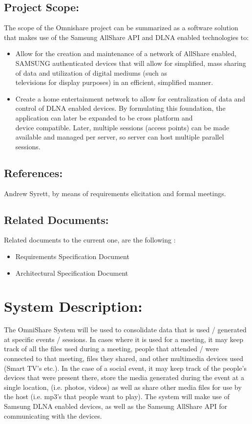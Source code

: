 \documentclass[12pt]{article}
\begin{document}
\subsection{Project Scope:}
The scope of the Omnishare project can be summarized as a software solution that makes use of the Samsung AllShare API and DLNA enabled technologies to:
\begin{itemize}
\item Allow for the creation and maintenance of a network of AllShare enabled, SAMSUNG authenticated devices  that will allow for simplified, mass sharing of data and utilization of digital mediums (such as
\\ televisions for display purposes) in an efficient, simplified manner.
\item  Create a home entertainment network to allow for centralization of data and control of DLNA enabled devices.
By formulating this foundation, the application can later be expanded to be cross platform and 
\\device compatible.  Later, multiple sessions (access points) can be made available and managed per server, so server can host multiple parallel sessions.
\end{itemize}

\subsection{References:}
Andrew Syrett, by means of requirements elicitation and formal meetings.

\subsection{Related Documents:}
Related documents to the current one, are the following :
\begin{itemize}
\item Requirements Specification Document
\item Architectural Specification Document
\end{itemize}

\newpage
\section{System Description:}
The OmniShare System will be used to consolidate data that is used / generated at specific events / sessions. In cases where it is used for a meeting, it may keep track of all the files used during a meeting, people that attended / were connected to that meeting, files they shared, and other multimedia devices used (Smart TV's etc.).
In the case of a social event, it may keep track of the people's devices that were present there, store the media generated during the event at a single location, (i.e. photos, videos) as well as share other media files for use by the host (i.e. mp3's that people want to play). The system will make use of Samsung DLNA enabled devices, as well as the Samsung AllShare API for communicating with the devices.
\end{document}
